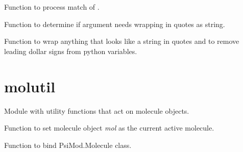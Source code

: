 \documentclass[letterpaper,10pt,english]{sphinxmanual}
\begin{document}

\begin{fulllineitems}
\label{index:input.process_set_commands}
Function to process match of .

\end{fulllineitems}


\begin{fulllineitems}
\label{index:input.process_word_quotes}
Function to determine if argument needs wrapping in quotes as string.

\end{fulllineitems}


\begin{fulllineitems}
\label{index:input.quotify}
Function to wrap anything that looks like a string in quotes
and to remove leading dollar signs from python variables.

\end{fulllineitems}



\section{molutil}
\label{index:module-molutil}\label{index:molutil}
Module with utility functions that act on molecule objects.

\begin{fulllineitems}
\label{index:molutil.activate}
Function to set molecule object \emph{mol} as the current active molecule.

\end{fulllineitems}


\begin{fulllineitems}
\label{index:molutil.dynamic_variable_bind}
Function to bind PsiMod.Molecule class.

\end{fulllineitems}
\end{document}
